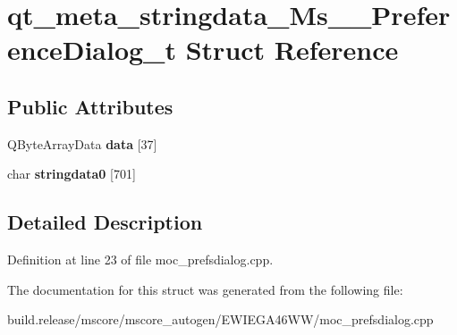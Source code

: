 \hypertarget{structqt__meta__stringdata___ms_____preference_dialog__t}{}\section{qt\+\_\+meta\+\_\+stringdata\+\_\+\+Ms\+\_\+\+\_\+\+Preference\+Dialog\+\_\+t Struct Reference}
\label{structqt__meta__stringdata___ms_____preference_dialog__t}
\subsection*{Public Attributes}
\begin{DoxyCompactItemize}
\item 
\mbox{\label{structqt__meta__stringdata___ms_____preference_dialog__t_a09f415d06b3d3da6e1b5925786a501be}} 
Q\+Byte\+Array\+Data {\bfseries data} \mbox{[}37\mbox{]}
\item 
\mbox{\label{structqt__meta__stringdata___ms_____preference_dialog__t_afd500c52f4071f95b5a78fe513e1ff5d}} 
char {\bfseries stringdata0} \mbox{[}701\mbox{]}
\end{DoxyCompactItemize}


\subsection{Detailed Description}


Definition at line 23 of file moc\+\_\+prefsdialog.\+cpp.



The documentation for this struct was generated from the following file\+:\begin{DoxyCompactItemize}
\item 
build.\+release/mscore/mscore\+\_\+autogen/\+E\+W\+I\+E\+G\+A46\+W\+W/moc\+\_\+prefsdialog.\+cpp\end{DoxyCompactItemize}
